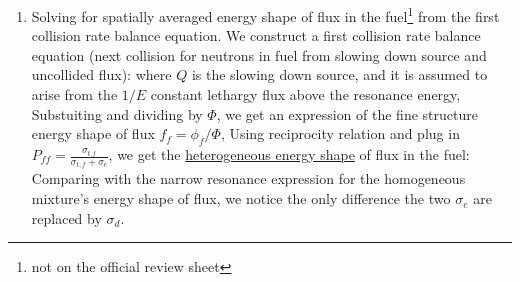 \documentclass{school-22.211-notes}
\begin{document}
\begin{enumerate}
\begin{enumerate}
    \item Solving for spatially averaged energy shape of flux in the fuel\footnote{not on the official review sheet} from the first collision rate balance equation.  We construct a first collision rate balance equation (next collision for neutrons in fuel from slowing down source and uncollided flux): 
      where $Q$ is the slowing down source, and it is assumed to arise from the $1/E$ constant lethargy flux above the resonance energy, 
      Substuiting and dividing by $\Phi$, we get an expression of the fine structure energy shape of flux $f_f = \phi_f / \Phi$, 
      Using reciprocity relation and plug in $P_{ff} = \frac{\sigma_{t.f}}{\sigma_{t,f} + \sigma_e}$, we get the \uline{heterogeneous energy shape} of flux in the fuel: 
     Comparing with the narrow resonance expression for the homogeneous mixture's energy shape of flux, we notice the only difference the two $\sigma_e$ are replaced by $\sigma_d$. 


\end{enumerate}
\end{enumerate}
\end{document}
